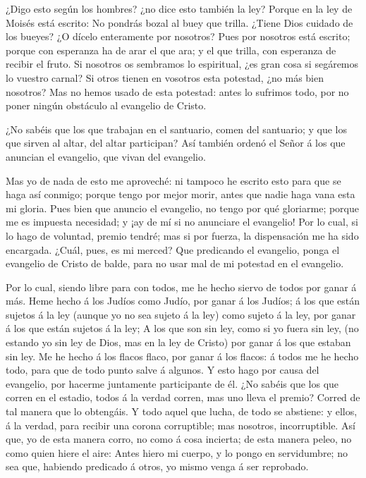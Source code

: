  ¿Digo esto según los hombres? ¿no dice esto también la ley?
 Porque en la ley de Moisés está escrito: No pondrás bozal
al buey que trilla. ¿Tiene Dios cuidado de los bueyes?  ¿O
dícelo enteramente por nosotros? Pues por nosotros está escrito; porque
con esperanza ha de arar el que ara; y el que trilla, con esperanza de
recibir el fruto.  Si nosotros os sembramos lo espiritual,
¿es gran cosa si segáremos lo vuestro carnal?  Si otros
tienen en vosotros esta potestad, ¿no más bien nosotros? Mas no hemos
usado de esta potestad: antes lo sufrimos todo, por no poner ningún
obstáculo al evangelio de Cristo.

 ¿No sabéis que los que trabajan en el santuario, comen del
santuario; y que los que sirven al altar, del altar participan?
 Así también ordenó el Señor á los que anuncian el
evangelio, que vivan del evangelio.

 Mas yo de nada de esto me aproveché: ni tampoco he escrito
esto para que se haga así conmigo; porque tengo por mejor morir, antes
que nadie haga vana esta mi gloria.  Pues bien que anuncio
el evangelio, no tengo por qué gloriarme; porque me es impuesta
necesidad; y ¡ay de mí si no anunciare el evangelio!  Por
lo cual, si lo hago de voluntad, premio tendré; mas si por fuerza, la
dispensación me ha sido encargada.  ¿Cuál, pues, es mi
merced? Que predicando el evangelio, ponga el evangelio de Cristo de
balde, para no usar mal de mi potestad en el evangelio.

 Por lo cual, siendo libre para con todos, me he hecho
siervo de todos por ganar á más.  Heme hecho á los Judíos
como Judío, por ganar á los Judíos; á los que están sujetos á la ley
(aunque yo no sea sujeto á la ley) como sujeto á la ley, por ganar á los
que están sujetos á la ley;  A los que son sin ley, como si
yo fuera sin ley, (no estando yo sin ley de Dios, mas en la ley de
Cristo) por ganar á los que estaban sin ley.  Me he hecho á
los flacos flaco, por ganar á los flacos: á todos me he hecho todo, para
que de todo punto salve á algunos.  Y esto hago por causa
del evangelio, por hacerme juntamente participante de él. 
¿No sabéis que los que corren en el estadio, todos á la verdad corren,
mas uno lleva el premio? Corred de tal manera que lo obtengáis.
 Y todo aquel que lucha, de todo se abstiene: y ellos, á la
verdad, para recibir una corona corruptible; mas nosotros,
incorruptible.  Así que, yo de esta manera corro, no como á
cosa incierta; de esta manera peleo, no como quien hiere el aire:
 Antes hiero mi cuerpo, y lo pongo en servidumbre; no sea
que, habiendo predicado á otros, yo mismo venga á ser reprobado.

